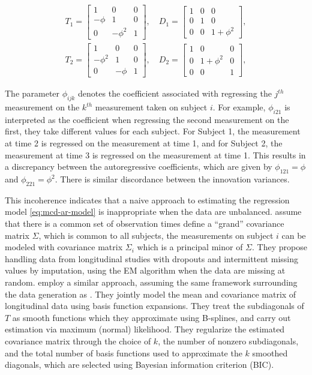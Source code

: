 \begin{align*}
T_1 = \begin{bmatrix}
1& 0 & 0  \\
-\phi & 1& 0  \\
0 & -\phi^2 & 1
\end{bmatrix}, \quad
D_1 = \begin{bmatrix} 
1 & 0 & 0  \\
0 & 1 & 0 \\
0 & 0 & 1 + \phi^2
\end{bmatrix}, \\
T_2 = \begin{bmatrix}
1& 0 & 0  \\
-\phi^2 & 1& 0  \\
0 & -\phi & 1
\end{bmatrix}, \quad
D_2 = \begin{bmatrix} 
1 & 0 & 0  \\
0 & 1 + \phi^2 & 0 \\
0 & 0 & 1 
\end{bmatrix}, 
\end{align*}

The parameter $\phi_{ijk}$ denotes the coefficient associated with regressing the $j^{th}$ measurement on the $k^{th}$ measurement taken on subject $i$. For example, $\phi_{i21}$ is interpreted as the coefficient when regressing the second measurement on the first, they take different values for each subject. For Subject 1, the measurement at time 2 is regressed on the measurement at time 1, and for Subject 2, the measurement at time 3 is regressed on the measurement at time 1. This results in a discrepancy between the autoregressive coefficients, which are given by $\phi_{121} = \phi$ and $\phi_{221} = \phi^2$. There is similar discordance between the innovation variances. 

\bigskip
 
This incoherence indicates that a naive approach to estimating the regression model \eqref{eq:mcd-ar-model} is inappropriate when the data are unbalanced. \cite{huang2012cautionary} assume that there is a common set of observation times define a ``grand'' covariance matrix $\Sigma$, which is common to all subjects, the measurements on subject $i$ can be modeled with covariance matrix $\Sigma_i$ which is a principal minor of $\Sigma$. They propose handling data from longitudinal studies with dropouts and intermittent missing values by imputation, using the EM algorithm when the data are missing at random.  \cite{huang2007estimation} employ a similar approach, assuming the same framework surrounding the data generation as \cite{huang2012cautionary}. They jointly model the mean and covariance matrix of longitudinal data using basis function expansions. They treat the subdiagonals of $T$ as smooth functions which they approximate using B-splines, and carry out estimation via maximum (normal) likelihood. They regularize the estimated covariance matrix through the choice of $k$, the number of nonzero subdiagonals, and the total number of basis functions used to approximate the $k$ smoothed diagonals, which are selected using Bayesian information criterion (BIC).  
   


